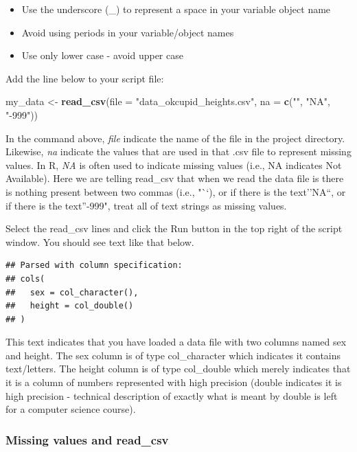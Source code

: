 \documentclass[
]{krantz}
\makeatletter
\newenvironment{Shaded}{\begin{snugshade}}{\end{snugshade}}
\newcommand{\DataTypeTok}[1]{\textcolor[rgb]{0.27,0.27,0.27}{#1}}
\newcommand{\KeywordTok}[1]{\textcolor[rgb]{0.27,0.27,0.27}{\textbf{#1}}}
\newcommand{\NormalTok}[1]{#1}
\newcommand{\StringTok}[1]{\textcolor[rgb]{0.5,0.5,0.5}{#1}}
\providecommand{\tightlist}{%
  \setlength{\itemsep}{0pt}\setlength{\parskip}{0pt}}
\newenvironment{kframe}{%
\medskip{}
\setlength{\fboxsep}{.8em}
 \def\at@end@of@kframe{}%
 \ifinner\ifhmode%
  \def\at@end@of@kframe{\end{minipage}}%
  \begin{minipage}{\columnwidth}%
 \fi\fi%
 \def\FrameCommand##1{\hskip\@totalleftmargin \hskip-\fboxsep
 \colorbox{shadecolor}{##1}\hskip-\fboxsep
     \hskip-\linewidth \hskip-\@totalleftmargin \hskip\columnwidth}%
 \MakeFramed {\advance\hsize-\width
   \@totalleftmargin\z@ \linewidth\hsize
   \@setminipage}}%
 {\par\unskip\endMakeFramed%
 \at@end@of@kframe}
\renewenvironment{Shaded}{\begin{kframe}}{\end{kframe}}
\makeatother
\begin{document}
\begin{itemize}
\tightlist
\item
  Use the underscore (\_) to represent a space in your variable object name
\item
  Avoid using periods in your variable/object names
\item
  Use only lower case - avoid upper case
\end{itemize}

Add the line below to your script file:

\begin{Shaded}
\begin{Highlighting}[]
\NormalTok{my_data <-}\StringTok{ }\KeywordTok{read_csv}\NormalTok{(}\DataTypeTok{file =} \StringTok{"data_okcupid_heights.csv"}\NormalTok{, }
                    \DataTypeTok{na =} \KeywordTok{c}\NormalTok{(}\StringTok{""}\NormalTok{, }\StringTok{"NA"}\NormalTok{, }\StringTok{"-999"}\NormalTok{))}
\end{Highlighting}
\end{Shaded}

In the command above, \emph{file} indicate the name of the file in the project directory. Likewise, \emph{na} indicate the values that are used in that .csv file to represent missing values. In R, \emph{NA} is often used to indicate missing values (i.e., NA indicates Not Available). Here we are telling read\_csv that when we read the data file is there is nothing present between two commas (i.e., "``), or if there is the text''NA``, or if there is the text''-999", treat all of text strings as missing values.

Select the read\_csv lines and click the Run button in the top right of the script window. You should see text like that below.

\begin{verbatim}
## Parsed with column specification:
## cols(
##   sex = col_character(),
##   height = col_double()
## )
\end{verbatim}

This text indicates that you have loaded a data file with two columns named sex and height. The sex column is of type col\_character which indicates it contains text/letters. The height column is of type col\_double which merely indicates that it is a column of numbers represented with high precision (double indicates it is high precision - technical description of exactly what is meant by double is left for a computer science course).

\hypertarget{missing-values-and-read_csv}{%
\subsubsection{Missing values and read\_csv}\label{missing-values-and-read_csv}}
\end{document}
